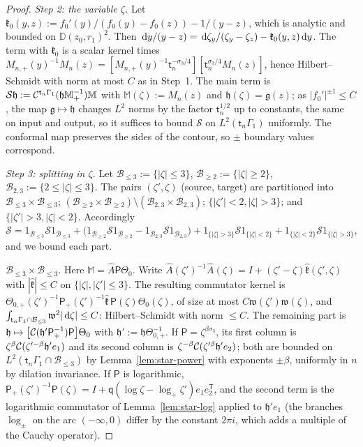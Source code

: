 \begin{proof}
\emph{Step 2: the variable $\zeta$.} Let $\mathfrak k_0(y,z):=f_0'(y)/(f_0(y)-f_0(z))-1/(y-z)$, which is analytic and
bounded on $\mathbb D(z_0,r_1)^2$. Then $\,\mathrm{d} y/(y-z)=\,\mathrm{d}\zeta_y/(\zeta_y-\zeta_z)-\mathfrak k_0(y,z)\,\mathrm{d} y$. The term with
$\mathfrak k_0$ is a scalar kernel times $M_{n,+}(y)^{-1}M_n(z)=[M_{n,+}(y)^{-1}\mathsf t_n^{-\sigma_3/4}][\mathsf t_n^{\sigma_3/4}M_n(z)]$,
hence Hilbert--Schmidt with norm at most $C$ as in Step~1. The main term is
$\mathcal S\mathfrak h:=\mathcal{C}^{\mathsf t_n\Gamma_1}(\mathfrak h\mathbb M_+^{-1})\mathbb M$ with $\mathbb M(\zeta):=M_n(z)$ and
$\mathfrak h(\zeta)=\mathfrak g(z)$; as $|f_0'|^{\pm1}\le C$, the map $\mathfrak g\mapsto\mathfrak h$ changes $L^2$ norms by
the factor $\mathsf t_n^{1/2}$ up to constants, the same on input and output, so it suffices to bound $\mathcal S$ on
$L^2(\mathsf t_n\Gamma_1)$ uniformly. The conformal map preserves the sides of the contour, so $\pm$ boundary values
correspond.

\emph{Step 3: splitting in $\zeta$.} Let $\mathcal B_{\le3}:=\{|\zeta|\le3\}$, $\mathcal B_{\ge2}:=\{|\zeta|\ge2\}$, $\mathcal B_{2,3}:=\{2\le|\zeta|\le3\}$. The pairs
$(\zeta',\zeta)$ (source, target) are partitioned into $\mathcal B_{\le3}\times\mathcal B_{\le3}$; $(\mathcal B_{\ge2}\times\mathcal B_{\ge2})\setminus(\mathcal B_{2,3}\times\mathcal B_{2,3})$;
$\{|\zeta'|<2,|\zeta|>3\}$; and $\{|\zeta'|>3,|\zeta|<2\}$. Accordingly
$\mathcal S=1_{\mathcal B_{\le3}}\mathcal S1_{\mathcal B_{\le3}}+\bigl(1_{\mathcal B_{\ge2}}\mathcal S1_{\mathcal B_{\ge2}}-1_{\mathcal B_{2,3}}\mathcal S1_{\mathcal B_{2,3}}\bigr)+1_{\{|\zeta|>3\}}\mathcal S1_{\{|\zeta|<2\}}
+1_{\{|\zeta|<2\}}\mathcal S1_{\{|\zeta|>3\}}$, and we bound each part.

\emph{$\mathcal B_{\le3}\times\mathcal B_{\le3}$.} Here $\mathbb M=\hat A\mathsf P\Theta_0$. Write $\hat A(\zeta')^{-1}\hat A(\zeta)=I+(\zeta'-\zeta)\hat{\mathfrak k}(\zeta',\zeta)$
with $|\hat{\mathfrak k}|\le C$ on $\{|\zeta|,|\zeta'|\le3\}$. The resulting commutator kernel is
$\Theta_{0,+}(\zeta')^{-1}\mathsf P_+(\zeta')^{-1}\hat{\mathfrak k}\,\mathsf P(\zeta)\Theta_0(\zeta)$, of size at most
$C\mathfrak w(\zeta')\mathfrak w(\zeta)$, and $\int_{\mathsf t_n\Gamma_1\cap\mathcal B_{\le3}}\mathfrak w^2|\,\mathrm{d}\zeta|\le C$: Hilbert--Schmidt with norm
$\le C$. The remaining part is $\mathfrak h\mapsto\bigl[\mathcal{C}(\mathfrak h'\mathsf P_+^{-1})\mathsf P\bigr]\Theta_0$ with
$\mathfrak h':=\mathfrak h\Theta_{0,+}^{-1}$. If $\mathsf P=\zeta^{\beta\sigma_3}$, its first column is
$\zeta^\beta\mathcal{C}(\zeta'^{-\beta}\mathfrak h'e_1)$ and its second column is $\zeta^{-\beta}\mathcal{C}(\zeta'^{\beta}
\mathfrak h'e_2)$; both are bounded on $L^2(\mathsf t_n\Gamma_1\cap\mathcal B_{\le3})$ by Lemma~\ref{lem:star-power} with exponents $\pm\beta$,
uniformly in $n$ by dilation invariance. If $\mathsf P$ is logarithmic,
$\mathsf P_+(\zeta')^{-1}\mathsf P(\zeta)=I+\mathsf q(\log\zeta-\log_+\zeta')e_1e_2^{\mathsf T}$, and the second term is the
logarithmic commutator of Lemma~\ref{lem:star-log} applied to $\mathfrak h'e_1$ (the branches $\log_\pm$ on the arc
$(-\infty,0)$ differ by the constant $2\pi i$, which adds a multiple of the Cauchy operator).


\end{proof}
